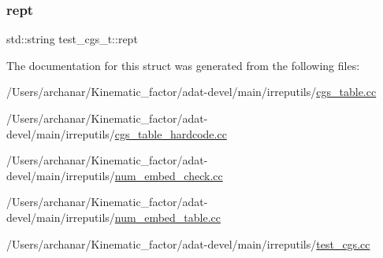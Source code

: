 \subsubsection{\texorpdfstring{rept}{rept}}
{\footnotesize\ttfamily std\+::string test\+\_\+cgs\+\_\+t\+::rept}



The documentation for this struct was generated from the following files\+:\begin{DoxyCompactItemize}
\item 
/\+Users/archanar/\+Kinematic\+\_\+factor/adat-\/devel/main/irreputils/\mbox{\hyperlink{adat-devel_2main_2irreputils_2cgs__table_8cc}{cgs\+\_\+table.\+cc}}\item 
/\+Users/archanar/\+Kinematic\+\_\+factor/adat-\/devel/main/irreputils/\mbox{\hyperlink{adat-devel_2main_2irreputils_2cgs__table__hardcode_8cc}{cgs\+\_\+table\+\_\+hardcode.\+cc}}\item 
/\+Users/archanar/\+Kinematic\+\_\+factor/adat-\/devel/main/irreputils/\mbox{\hyperlink{adat-devel_2main_2irreputils_2num__embed__check_8cc}{num\+\_\+embed\+\_\+check.\+cc}}\item 
/\+Users/archanar/\+Kinematic\+\_\+factor/adat-\/devel/main/irreputils/\mbox{\hyperlink{adat-devel_2main_2irreputils_2num__embed__table_8cc}{num\+\_\+embed\+\_\+table.\+cc}}\item 
/\+Users/archanar/\+Kinematic\+\_\+factor/adat-\/devel/main/irreputils/\mbox{\hyperlink{adat-devel_2main_2irreputils_2test__cgs_8cc}{test\+\_\+cgs.\+cc}}\end{DoxyCompactItemize}

